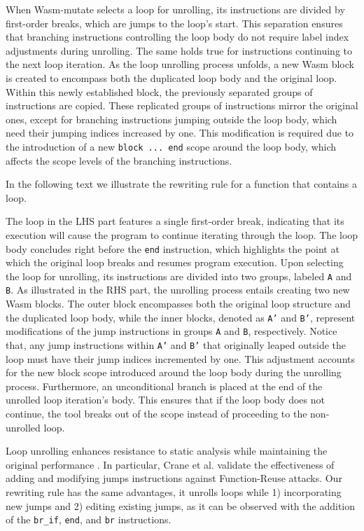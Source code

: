 \documentclass[sigplan,screen]{acmart}
\newcommand{\tool}{Wasm-mutate\xspace}
\begin{document}
When \tool selects a loop for unrolling, its instructions are divided by first-order breaks, which are jumps to the loop's start. This separation ensures that branching instructions controlling the loop body do not require label index adjustments during unrolling. The same holds true for instructions continuing to the next loop iteration.
As the loop unrolling process unfolds, a new Wasm block is created to encompass both the duplicated loop body and the original loop. 
Within this newly established block, the previously separated groups of instructions are copied. 
These replicated groups of instructions mirror the original ones, except for branching instructions jumping outside the loop body, which need their jumping indices increased by one. This modification is required due to the introduction of a new \texttt{block ... end} scope around the loop body, which affects the scope levels of the branching instructions.

In the following text we illustrate the rewriting rule for a function that contains a loop. 


The loop in the LHS part features a single first-order break, indicating that its execution will cause the program to continue iterating through the loop. 
The loop body concludes right before the \texttt{end} instruction, which highlights the point at which the original loop breaks and resumes program execution.
Upon selecting the loop for unrolling, its instructions are divided into two groups, labeled \texttt{A} and \texttt{B}. 
As illustrated in the RHS part, the unrolling process entails creating two new Wasm blocks. 
The outer block encompasses both the original loop structure and the duplicated loop body, while the inner blocks, denoted as \texttt{A'} and \texttt{B'}, represent modifications of the jump instructions in groups \texttt{A} and \texttt{B}, respectively.
Notice that, any jump instructions within \texttt{A'} and \texttt{B'} that originally leaped outside the loop must have their jump indices incremented by one. 
This adjustment accounts for the new block scope introduced around the loop body during the unrolling process. 
Furthermore, an unconditional branch is placed at the end of the unrolled loop iteration's body. 
This ensures that if the loop body does not continue, the tool breaks out of the scope instead of proceeding to the non-unrolled loop.


Loop unrolling enhances resistance to static analysis while maintaining the original performance \cite{10.1145/3453483.3454035}. 
In particular, Crane et al. \cite{10.1145/2810103.2813682} validate the effectiveness of adding and modifying jumps instructions against Function-Reuse attacks.
Our rewriting rule has the same advantages, it unrolls loops while 1) incorporating new jumps and 2) editing existing jumps, as it can be observed with the addition of the \texttt{br_if}, \texttt{end}, and \texttt{br} instructions. 
\end{document}
